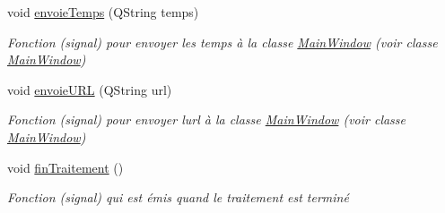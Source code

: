 \begin{DoxyCompactItemize}
void \hyperlink{classTraitement_ab8dfd067d627e71a4abb42aaf7874115}{envoie\+Temps} (Q\+String temps)
\begin{DoxyCompactList}\small\item\em Fonction (signal) pour envoyer les temps à la classe \hyperlink{classMainWindow}{Main\+Window} (voir classe \hyperlink{classMainWindow}{Main\+Window}) \end{DoxyCompactList}\item 
void \hyperlink{classTraitement_ab4ed4bad3ea04585617fbc8cd758193a}{envoie\+U\+RL} (Q\+String url)
\begin{DoxyCompactList}\small\item\em Fonction (signal) pour envoyer l\textquotesingle{}url à la classe \hyperlink{classMainWindow}{Main\+Window} (voir classe \hyperlink{classMainWindow}{Main\+Window}) \end{DoxyCompactList}\item 
void \hyperlink{classTraitement_a83495c6e878e66511b8af67ee369a012}{fin\+Traitement} ()
\begin{DoxyCompactList}\small\item\em Fonction (signal) qui est émis quand le traitement est terminé \end{DoxyCompactList}\end{DoxyCompactItemize}
